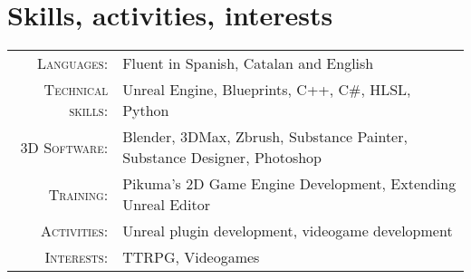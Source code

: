 \documentclass[a4paper,10pt]{article} %
\begin{document}
\section{Skills, activities, interests}

\begin{tabular}{rl}
\textsc{Languages}: & Fluent in Spanish, Catalan and English \\
\textsc{Technical skills}: & Unreal Engine, Blueprints, C++, C\#, HLSL, Python \\
\textsc{3D Software}: & Blender, 3DMax, Zbrush, Substance Painter, Substance Designer, Photoshop \\
\textsc{Training}: & Pikuma's 2D Game Engine Development, Extending Unreal Editor \\
\textsc{Activities}: & Unreal plugin development, videogame development \\
\textsc{Interests}: & TTRPG, Videogames \\
\end{tabular}
\end{document}

